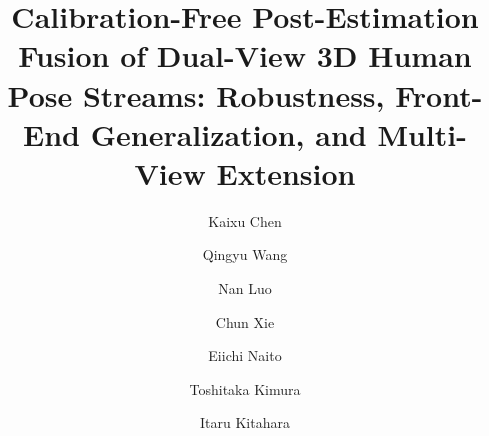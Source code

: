 \documentclass[preprint,12pt]{elsarticle}
\providecommand{\DIFaddbegin}{} %
\providecommand{\DIFaddend}{} %
\providecommand{\DIFadd}[1]{{\protect\color{blue}#1}} %
\begin{document}
\begin{frontmatter}

\title{ Calibration-Free \DIFaddbegin \DIFadd{Post-Estimation Fusion of }\DIFaddend Dual-View 3D \DIFaddbegin \DIFadd{Human }\DIFaddend Pose  \DIFaddbegin \DIFadd{Streams: Robustness, Front-End Generalization, and Multi-View Extension}\DIFaddend {}}

\author[ccs]{Kaixu Chen}
\author[imiss]{Qingyu Wang}
\author[imiss]{Nan Luo}
\author[ccs]{Chun Xie}
\author[nict]{Eiichi Naito}
\author[ntt]{Toshitaka Kimura}
\author[ccs]{Itaru Kitahara}

\address[ccs]{Center for Computational Sciences, University of Tsukuba, Tsukuba, Ibaraki, Japan}
\address[imiss]{Intelligent and Mechanical Interaction Systems, University of Tsukuba, Tsukuba, Ibaraki, Japan}
\address[nict]{Advanced ICT Research Institute, National Institute of Information and Communications Technology, Osaka, Japan}
\address[ntt]{NTT Communication Science Laboratories, Tokyo, Japan}


\end{frontmatter}
\end{document}
